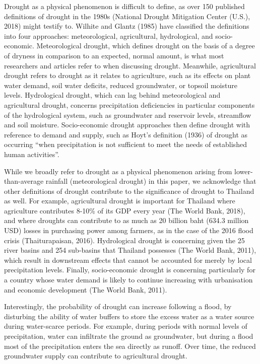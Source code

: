 Drought as a physical phenomenon is difficult to define, as over 150 published definitions of drought in the 1980s (National Drought Mitigation Center (U.S.), 2018) might testify to. Wilhite and Glantz (1985) have classified the definitions into four approaches: meteorological, agricultural, hydrological, and socio-economic. Meteorological drought, which defines drought on the basis of a degree of dryness in comparison to an expected, normal amount, is what most researchers and articles refer to when discussing drought. Meanwhile, agricultural drought refers to drought as it relates to agriculture, such as its effects on plant water demand, soil water deficits, reduced groundwater, or topsoil moisture levels. Hydrological drought, which can lag behind meteorological and agricultural drought, concerns precipitation deficiencies in particular components of the hydrological system, such as groundwater and reservoir levels, streamflow and soil moisture. Socio-economic drought approaches then define drought with reference to demand and supply, such as Hoyt's definition (1936) of drought as occurring ``when precipitation is not sufficient to meet the needs of established human activities''. 

While we broadly refer to drought as a physical phenomenon arising from lower-than-average rainfall (meteorological drought) in this paper, we acknowledge that other definitions of drought contribute to the significance of drought to Thailand as well. For example, agricultural drought is important for Thailand where agriculture contributes 8-10\% of its GDP every year (The World Bank, 2018), and where droughts can contribute to as much as 20 billion baht (634.3 million USD) losses in purchasing power among farmers, as in the case of the 2016 flood crisis (Thaiturapaisan, 2016). Hydrological drought is concerning given the 25 river basins and 254 sub-basins that Thailand possesses (The World Bank, 2011), which result in downstream effects that cannot be accounted for merely by local precipitation levels. Finally, socio-economic drought is concerning particularly for a country whose water demand is likely to continue increasing with urbanisation and economic development (The World Bank, 2011).

Interestingly, the probability of drought can increase following a flood, by disturbing the ability of water buffers to store the excess water as a water source during water-scarce periods. For example, during periods with normal levels of precipitation, water can infiltrate the ground as groundwater, but during a flood most of the precipitation enters the sea directly as runoff. Over time, the reduced groundwater supply can contribute to agricultural drought.

